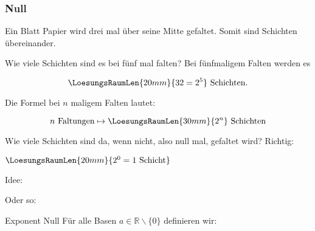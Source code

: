 \subsubsection{Null}

Ein Blatt Papier wird drei mal über seine Mitte gefaltet. Somit
sind  Schichten übereinander.

Wie viele Schichten sind es bei fünf mal falten? Bei fünfmaligem Falten werden
es

$$\LoesungsRaumLen{20mm}{32 = 2^5} \text{ Schichten.}$$

Die Formel bei $n$ maligem Falten lautet:

$$n \text{ Faltungen} \mapsto \LoesungsRaumLen{30mm}{2^n}\text{ Schichten}$$


Wie viele Schichten sind da, wenn nicht, also null mal, gefaltet wird?
Richtig:

$\LoesungsRaumLen{20mm}{2^0 = 1 \text{ Schicht}}$

Idee:

Oder so:

\begin{definition}{Exponent Null}{} Für alle Basen
$a \in \mathbb{R}\backslash\{0\}$ definieren wir:
\begin{center}
\end{center}
\end{definition}



 




